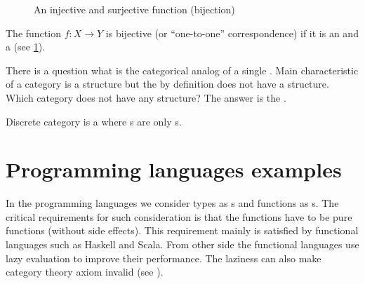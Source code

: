 \begin{figure}
  \centering
  \caption{An injective and surjective function (bijection)}
  \label{fig:bijection}
\end{figure}

\begin{definition}[Bijection]
  \label{def:bijection}
  The function $f: X \rightarrow Y$ is bijective (or ``one-to-one''
  correspondence) if it is an  and a
   (see \cref{fig:bijection}). 
\end{definition}

There is a question what is the categorical analog of a single
. Main characteristic of a category is a structure
but the  by definition does not have a structure.
Which category 
does not have any structure? The answer is
the . 

\begin{definition}
  \label{def:discrete_category}
  Discrete category is a  where
  s are only s.
\end{definition}
  
\section{Programming languages examples}
\label{sec:plcategory_example}
In the programming languages we consider types as
s and functions as
s. The critical requirements for such
consideration is that the functions have to be pure functions (without
side effects). This requirement mainly is satisfied by functional
languages such as Haskell and Scala. From other side the functional
languages use lazy evaluation to improve their performance. The laziness
can also make category theory axiom invalid (see
). 

